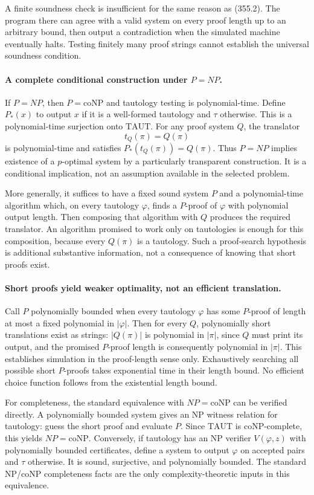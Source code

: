 \documentclass[11pt]{article}
\begin{document}
A finite soundness check is insufficient for the same reason as (355.2).
The program there can agree with a valid system on every proof length
up to an arbitrary bound, then output a contradiction when the simulated
machine eventually halts. Testing finitely many proof strings cannot
establish the universal soundness condition.

\paragraph{A complete conditional construction under $P=NP$.}
If $P=NP$, then $P=\mathrm{coNP}$ and tautology testing is polynomial-time.
Define $P_*(x)$ to output $x$ if it is a well-formed tautology and $\tau$
otherwise. This is a polynomial-time surjection onto $\mathrm{TAUT}$.
For any proof system $Q$, the translator
\[
 t_Q(\pi)=Q(\pi)
\]
is polynomial-time and satisfies $P_*(t_Q(\pi))=Q(\pi)$.
Thus $P=NP$ implies existence of a $p$-optimal system by a particularly
transparent construction. It is a conditional implication, not an
assumption available in the selected problem.

More generally, it suffices to have a fixed sound system $P$ and a
polynomial-time algorithm which, on every tautology $\varphi$, finds
a $P$-proof of $\varphi$ with polynomial output length. Then composing
that algorithm with $Q$ produces the required translator. An algorithm
promised to work only on tautologies is enough for this composition,
because every $Q(\pi)$ is a tautology. Such a proof-search hypothesis
is additional substantive information, not a consequence of knowing
that short proofs exist.

\paragraph{Short proofs yield weaker optimality, not an efficient translation.}
Call $P$ polynomially bounded when every tautology $\varphi$ has some
$P$-proof of length at most a fixed polynomial in $|\varphi|$.
Then for every $Q$, polynomially short translations exist as strings:
$|Q(\pi)|$ is polynomial in $|\pi|$, since $Q$ must print its output,
and the promised $P$-proof length is consequently polynomial in $|\pi|$.
This establishes simulation in the proof-length sense only. Exhaustively
searching all possible short $P$-proofs takes exponential time in their
length bound. No efficient choice function follows from the existential
length bound.

For completeness, the standard equivalence with $NP=\mathrm{coNP}$
can be verified directly. A polynomially bounded system gives an NP
witness relation for tautology: guess the short proof and evaluate $P$.
Since $\mathrm{TAUT}$ is coNP-complete, this yields $NP=\mathrm{coNP}$.
Conversely, if tautology has an NP verifier $V(\varphi,z)$ with
polynomially bounded certificates, define a system to output $\varphi$
on accepted pairs and $\tau$ otherwise. It is sound, surjective, and
polynomially bounded. The standard NP/coNP completeness facts are the
only complexity-theoretic inputs in this equivalence.
\end{document}
